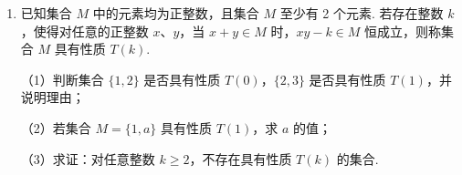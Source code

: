 \documentclass[a4paper,11pt]{article}
\begin{document}
\begin{enumerate}
（2）是否存在正数 $r$，使得代理商每年获得的代理费超过厂家委托代理商之后自身实际到手的收入？若存在，求出所有满足条件的 $r$；若不存在，请说明理由.

\ifanswer
\solbegin
{}
\step{则 $r$ 的取值范围是 $[1,100)$；}
\solend
\fi

\ansspace[8]

\item 已知集合 $M$ 中的元素均为正整数，且集合 $M$ 至少有 2 个元素. 若存在整数 $k$，使得对任意的正整数 $x$、$y$，当 $x+y\in M$ 时，$xy-k\in M$ 恒成立，则称集合 $M$ 具有性质 $T(k)$.

（1）判断集合 $\{1,2\}$ 是否具有性质 $T(0)$，$\{2,3\}$ 是否具有性质 $T(1)$，并说明理由；

（2）若集合 $M=\{1,a\}$ 具有性质 $T(1)$，求 $a$ 的值；

（3）求证：对任意整数 $k\geqslant2$，不存在具有性质 $T(k)$ 的集合.


\end{enumerate}
\end{document}
